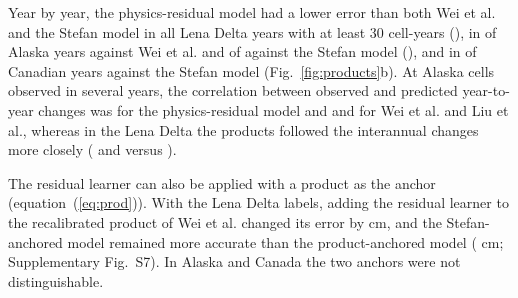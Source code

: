 
Year by year, the physics-residual model had a lower error than both Wei et al. and the Stefan model in all \nywLen{} Lena Delta years with at least 30 cell-years (\nyrsywLe), in \nywAkRoWeiwin{} of \nywAkRoWein{} Alaska years against Wei et al. and \nywAkRoPowin{} of \nywAkRoPon{} against the Stefan model (\nyrsywAk), and in \nywCaRoPowin{} of \nywCaRoPon{} Canadian years against the Stefan model (Fig.~\ref{fig:products}b). At Alaska cells observed in several years, the correlation between observed and predicted year-to-year changes was \nrdeltaAkRo{} for the physics-residual model and \nrdeltaAkWei{} and \nrdeltaAkLiu{} for Wei et al. and Liu et al., whereas in the Lena Delta the products followed the interannual changes more closely (\nrdeltaLeWei{} and \nrdeltaLeLiu{} versus \nrdeltaLeRo).

The residual learner can also be applied with a product as the anchor (equation~(\ref{eq:prod})). With the Lena Delta labels, adding the residual learner to the recalibrated product of Wei et al. changed its error by \npadLeRpPcal{} cm, and the Stefan-anchored model remained more accurate than the product-anchored model (\npadLeRoRp{} cm; Supplementary Fig.~S7). In Alaska and Canada the two anchors were not distinguishable.

